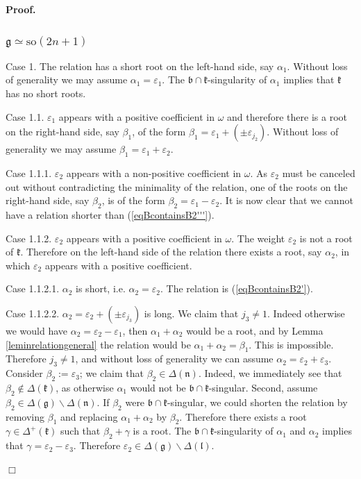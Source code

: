 \documentclass[12pt]{report}
\newenvironment{proof}[1][]{ \textbf{Proof#1. }}{$\Box$\medskip}
\newcommand{\kk}{\mathfrak{k}}
\newcommand{\nn}{\mathfrak{n}}
\newcommand{\gG}{\mathfrak{g}}
\newcommand{\bb}{\mathfrak{b}}
\newcommand{\lL}{\mathfrak{l}}
\newcommand{\refeq}[1]{(\ref{#1})}
\newcommand{\so}{\mathrm{so}}
\newcommand{\eps}{\varepsilon}
\newcommand{\pmf}[1]{ \pm}%
\begin{document}
\begin{proof}
\subsubsection{$\gG\simeq\so(2n+1)$}

\noindent Case 1. The relation has a short root on the left-hand side, say $\alpha_1$. Without loss of generality we may assume $\alpha_1=\eps_{1}$. The $\bb\cap\kk$-singularity of $\alpha_1$ implies that $\kk$ has no short roots.

\noindent Case 1.1. $\eps_{1}$ appears with a positive coefficient in $\omega$ and therefore there is a root on the right-hand side, say $\beta_1$, of the form $\beta_1= \eps_{1}+ (\pmf{j_2}\eps_{j_2})$. Without loss of generality we may assume $\beta_1=\eps_1+\eps_2$.

\noindent Case 1.1.1. $\eps_{2}$ appears with a non-positive coefficient in $\omega$. As $\eps_2$ must be canceled out without contradicting the minimality of the relation, one of the roots on the right-hand side, say $\beta_2$, is of the form $\beta_2 = \eps_{1} -\eps_{2}$. It is now clear that we cannot have a relation shorter than (\ref{eqBcontainsB2'''}).

\noindent Case 1.1.2. $\eps_{2}$ appears with a positive coefficient in $\omega$. The weight $\eps_{2}$ is not a root of $\kk$. Therefore on the left-hand side of the relation there exists a root, say $\alpha_2$, in which $\eps_{2}$ appears with a positive coefficient.

\noindent Case 1.1.2.1. $\alpha_2$ is short, i.e. $\alpha_2=\eps_2$. The relation is \refeq{eqBcontainsB2'}.

\noindent Case 1.1.2.2. $\alpha_2=\eps_2+(\pmf{j_3}\eps_{j_3})$ is long. We claim that $j_3\neq 1$. Indeed otherwise we would have $\alpha_2=\eps_2-\eps_1$, then $\alpha_1+\alpha_2$ would be a root, and by Lemma \ref{leminrelationgeneral} the relation would be $\alpha_1+\alpha_2=\beta_1$. This is impossible. Therefore $j_3\neq 1$, and without loss of generality we can assume $\alpha_2=\eps_2+\eps_3$. Consider $\beta_2:=\eps_3$;  we claim that $\beta_2\in\Delta(\nn)$. Indeed, we immediately see that $\beta_2\notin\Delta(\kk)$, as otherwise $\alpha_1$ would not be $\bb\cap\kk$-singular. Second, assume $\beta_2 \in\Delta(\gG) \backslash \Delta(\nn)$. If $\beta_2$ were $\bb\cap\kk$-singular, we could shorten the relation by removing $\beta_1$ and replacing $\alpha_1+\alpha_2$ by $\beta_2$. Therefore there exists a root $\gamma\in\Delta^+(\kk)$ such that $\beta_2+\gamma$ is a root. The $\bb\cap\kk$-singularity of $\alpha_1$ and $\alpha_2$ implies that $\gamma=\eps_2-\eps_3$. Therefore $\eps_2\in\Delta(\gG)\backslash\Delta(\lL)$. 


\end{proof}
\end{document}
